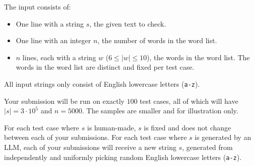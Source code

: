 
    The input consists of:
    \begin{itemize}
        \item One line with a string $s$, the given text to check.
        \item One line with an integer $n$, the number of words in the word list.
        \item $n$ lines, each with a string $w$ ($6 \leq |w| \leq 10$), the words in the word list.
            The words in the word list are distinct and fixed per test case.
    \end{itemize}
    All input strings only consist of English lowercase letters (\texttt{a-z}).

    Your submission will be run on exactly $100$ test cases, all of which will have $|s| = 3\cdot10^5$ and $n = 5000$.
    The samples are smaller and for illustration only.

    For each test case where $s$ is human-made, $s$ is fixed and does not change between each of your submissions.
    For each test case where $s$ is generated by an LLM,
    each of your submissions will receive a new string $s$,
    generated from independently and uniformly picking random English lowercase letters (\texttt{a-z}).
